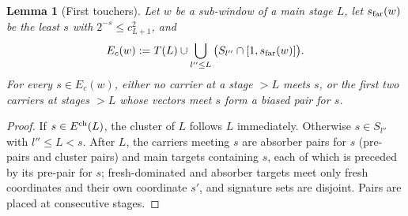 \documentclass[10pt]{amsart}
\newtheorem{lemma}[theorem]{Lemma}
\theoremstyle{definition}
\theoremstyle{remark}
\begin{document}
\begin{lemma}[First touchers]\label{lem:II-firsttouch}
Let $w$ be a sub-window of a main stage $L$, let $s_{\rm far}(w)$ be the least $s$
with $2^{-s}\le c_{L+1}^2$, and
\[
 E_c(w):=T(L)\cup\bigcup_{l''\le L}\big(S_{l''}\cap[1,s_{\rm far}(w)]\big).
\]
For every $s\in E_c(w)$, either no carrier at a stage $>L$ meets $s$, or the first
two carriers at stages $>L$ whose vectors meet $s$ form a biased pair for $s$.
\end{lemma}

\begin{proof}
If $s\in E^{\rm ch}(L)$, the cluster of $L$ follows $L$ immediately.  Otherwise $s\in
S_{l''}$ with $l''\le L<s$.  After $L$, the carriers meeting $s$ are absorber pairs
for $s$ (pre-pairs and cluster pairs) and main targets containing $s$, each of
which is preceded by its pre-pair for $s$; fresh-dominated and absorber targets
meet only fresh coordinates and their own coordinate $s'$, and signature sets
are disjoint.  Pairs are placed at consecutive stages.
\end{proof}
\end{document}
